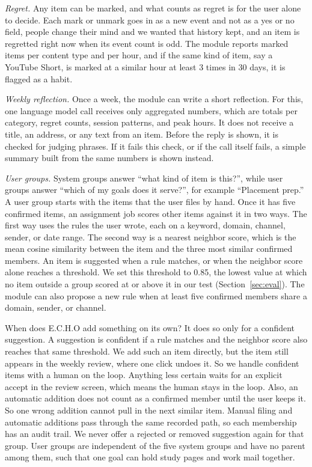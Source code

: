 \documentclass[conference]{IEEEtran}
\begin{document}
\textit{Regret.} Any item can be marked, and what counts as regret is for the user alone to decide. Each mark or unmark goes in as a new event and not as a yes or no field, people change their mind and we wanted that history kept, and an item is regretted right now when its event count is odd. The module reports marked items per content type and per hour, and if the same kind of item, say a YouTube Short, is marked at a similar hour at least 3 times in 30 days, it is flagged as a habit.

\textit{Weekly reflection.} Once a week, the module can write a short reflection. For this, one language model call receives only aggregated numbers, which are totals per category, regret counts, session patterns, and peak hours. It does not receive a title, an address, or any text from an item. Before the reply is shown, it is checked for judging phrases. If it fails this check, or if the call itself fails, a simple summary built from the same numbers is shown instead.

\textit{User groups.} System groups answer ``what kind of item is this?'', while user groups answer ``which of my goals does it serve?'', for example ``Placement prep.'' A user group starts with the items that the user files by hand. Once it has five confirmed items, an assignment job scores other items against it in two ways. The first way uses the rules the user wrote, each on a keyword, domain, channel, sender, or date range. The second way is a nearest neighbor score, which is the mean cosine similarity between the item and the three most similar confirmed members. An item is suggested when a rule matches, or when the neighbor score alone reaches a threshold. We set this threshold to 0.85, the lowest value at which no item outside a group scored at or above it in our test (Section~\ref{sec:eval}). The module can also propose a new rule when at least five confirmed members share a domain, sender, or channel.

When does E.C.H.O add something on its own? It does so only for a confident suggestion. A suggestion is confident if a rule matches and the neighbor score also reaches that same threshold. We add such an item directly, but the item still appears in the weekly review, where one click undoes it. So we handle confident items with a human on the loop. Anything less certain waits for an explicit accept in the review screen, which means the human stays in the loop. Also, an automatic addition does not count as a confirmed member until the user keeps it. So one wrong addition cannot pull in the next similar item. Manual filing and automatic additions pass through the same recorded path, so each membership has an audit trail. We never offer a rejected or removed suggestion again for that group. User groups are independent of the five system groups and have no parent among them, such that one goal can hold study pages and work mail together.
\end{document}
